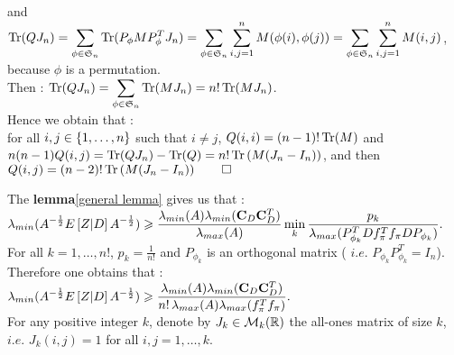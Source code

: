 and \\
$\operatorname{Tr}(QJ_{n}) = \displaystyle\sum\limits_{\phi \in \mathfrak{S}_{n}} \operatorname{Tr}(P_{\phi} M P_{\phi}^{T} J_{n}) = \displaystyle\sum\limits_{\phi \in \mathfrak{S}_{n}}\displaystyle\sum_{i,j=1}^{n} M(\phi(i),\phi(j)) =\displaystyle\sum\limits_{\phi \in \mathfrak{S}_{n}} \displaystyle\sum_{i,j=1}^{n} M(i,j) $, because $\phi$ is a permutation.\\
Then : $\operatorname{Tr}(QJ_{n})  =  \displaystyle\sum\limits_{\phi \in \mathfrak{S}_{n}} \operatorname{Tr}(M J_{n}) = n! \operatorname{Tr}(MJ_{n})$.\\
Hence we obtain that :\\
 for all $i,j\in \left\{1,\dots,n\right\}$ such that $i\neq j$, $Q(i,i) = (n-1)! \operatorname{Tr}(M)$ and \\$n(n-1)Q(i,j) =\operatorname{Tr}(QJ_{n})-\operatorname{Tr}(Q) = n!\operatorname{Tr}\left(M(J_{n}-I_{n})\right)$, and then $Q(i,j) = (n-2)!\operatorname{Tr}\left(M(J_{n}-I_{n})\right) \qed$



\pr

The \textbf{lemma}\ref{general lemma} gives us that :\\ 
$\displaystyle \lambda_{min}(A^{-\frac12}E\left[Z|D\right]A^{-\frac12} ) \geqslant \displaystyle  \frac{\lambda_{min}(A) \lambda_{min}(\bold{C}_{D} \bold{C}_{D}^{T})}{ \lambda_{max}(A)} \min_{k} \frac{p_{k}}{\lambda_{max}( P_{\phi_{k}}^{T} D f_{\pi}^{T} f_{\pi} D P_{\phi_{k}} )}.$\\
For all $k = 1,\dots,n!$, $p_{k} = \frac{1}{n!}$ and $P_{\phi_{k}}$ is an orthogonal matrix ( $i.e.$ $P_{\phi_{k}} P_{\phi_{k}}^{T} = I_{n}$). Therefore one obtains that :\\

$\displaystyle \lambda_{min}(A^{-\frac12}E\left[Z|D\right]A^{-\frac12} ) \geqslant \displaystyle  \frac{\lambda_{min}(A) \lambda_{min}(\bold{C}_{D} \bold{C}_{D}^{T})}{ n! \, \lambda_{max}(A) \lambda_{max}(f_{\pi}^{T} f_{\pi})}. $\\
 
 For any positive integer $k$, denote by $J_{k} \in {\mathcal M}_{k}({\mathbb R})$ the all-ones matrix of size $k$, $i.e.$ $J_{k}(i,j) = 1$ for all $i,j = 1,\dots, k$.\\
  
